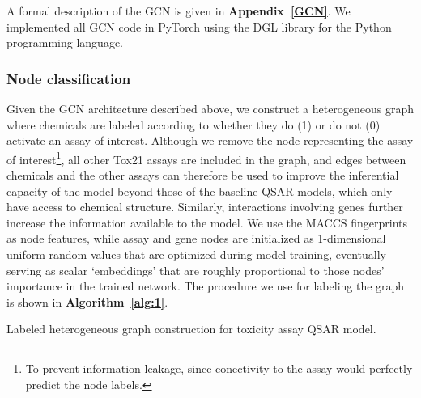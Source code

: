\documentclass{ws-procs11x85}
\begin{document}
A formal description of the GCN is given in \textbf{Appendix~\ref{GCN}}.
We implemented all GCN code in PyTorch using the DGL library for the Python programming language.

\subsubsection{Node classification}\label{methods-nc}
Given the GCN architecture described above, we construct a heterogeneous graph where chemicals are labeled according to whether they do (1) or do not (0) activate an assay of interest.
Although we remove the node representing the assay of interest\footnote{To prevent information leakage, since conectivity to the assay would perfectly predict the node labels.}, all other Tox21 assays are included in the graph, and edges between chemicals and the other assays can therefore be used to improve the inferential capacity of the model beyond those of the baseline QSAR models, which only have access to chemical structure.
Similarly, interactions involving genes further increase the information available to the model.
We use the MACCS fingerprints as node features, while assay and gene nodes are initialized as 1-dimensional uniform random values that are optimized during model training, eventually serving as scalar `embeddings' that are roughly proportional to those nodes' importance in the trained network.
The procedure we use for labeling the graph is shown in \textbf{Algorithm~\ref{alg:1}}.

\begin{algorithm}
\caption{Labeled heterogeneous graph construction for toxicity assay QSAR model.}\label{alg:1}
\begin{algorithmic}
   \Else
   \EndIf
\EndFor
{}
\end{algorithmic}
\end{algorithm}
\end{document}
